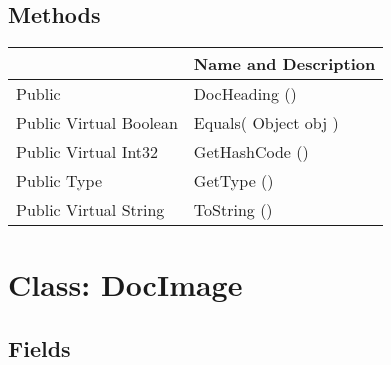 \documentclass[11pt, oneside, a4paper]{book}
\begin{document}
\subsection{Methods}
\begin{center}
\begin{tabular}{| p{3cm} | p{12cm} | }
\hline
\textbf{ } & \textbf{ Name and Description}\\
\hline
 Public  &  DocHeading ()\hypertarget{SoftwareEngineeringTools.{}Documentation.{}DocHeading.{}DocHeading}{}\\
\hline
 Public  Virtual  Boolean &  Equals(\hypertarget{SoftwareEngineeringTools.{}Documentation.{}DocHeading.{}Equals\_Object}{} Object  obj  )\\
\hline
 Public  Virtual  Int32 &  GetHashCode ()\hypertarget{SoftwareEngineeringTools.{}Documentation.{}DocHeading.{}GetHashCode}{}\\
\hline
 Public  Type &  GetType ()\hypertarget{SoftwareEngineeringTools.{}Documentation.{}DocHeading.{}GetType}{}\\
\hline
 Public  Virtual  String &  ToString ()\hypertarget{SoftwareEngineeringTools.{}Documentation.{}DocHeading.{}ToString}{}\\
\hline
\end{tabular}
\end{center}
 


\hypertarget{SoftwareEngineeringTools.{}Documentation.{}DocImage}{}
\section{Class: DocImage}

\subsection{Fields}
\end{document}
